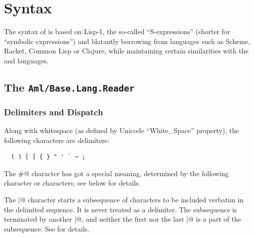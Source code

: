 
\chapter{Syntax}
\label{ch:aml-base-syntax}

The syntax of \AmlBase is based on Lisp-1, the so-called ``S-expressions'' (shorter for ``symbolic expressions'') and blatantly borrowing from languages such as Scheme, Racket, Common Lisp or Clojure, while maintaining certain similarities with the \Aml and \AmlCore languages. 




\section[The Aml/Base.Lang.Reader]{The \lstinline!Aml/Base.Lang.Reader!}
\label{sec:aml-base-lang-reader}




\subsection{Delimiters and Dispatch}
\label{subsec:aml-base-lang-reader-delimiters-dispatch}

Along with whitespace (as defined by Unicode ``White\_Space'' property), the following characters are delimiters:

\begin{lstlisting}
  ( ) [ ] { } " ' ` ~ ;
\end{lstlisting}

The \lstinline@#@ character has got a special meaning, determined by the following character or characters; see below for details.

The \lstinline@|@ character starts a subsequence of characters to be included verbatim in the delimited sequence. It is never treated as a delimiter. The subsequence is terminated by another \lstinline@|@, and neither the first nor the last \lstinline@|@ is a part of the subsequence. See  for details.


